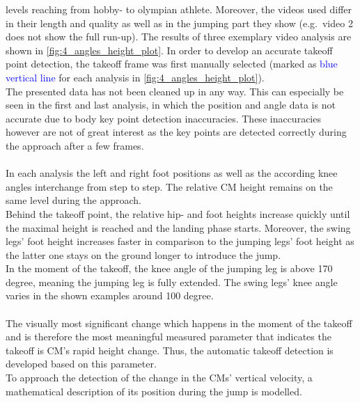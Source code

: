 levels reaching from hobby- to olympian athlete.
Moreover, the videos used differ in their length and quality as well as in the
jumping part they show (e.g.\ video 2 does not show the full run-up).
The results of three exemplary video analysis are shown in
\autoref{fig:4_angles_height_plot}.
In order to develop an accurate takeoff point detection, the takeoff frame was
first manually selected (marked as \textcolor{blue}{blue vertical line} for
each analysis in \autoref{fig:4_angles_height_plot}).\\
The presented data has not been cleaned up in any way.
This can especially be seen in the first and last analysis, in which the
position and angle data is not accurate due to body key point detection
inaccuracies.
These inaccuracies however are not of great interest as the key points are
detected correctly during the approach after a few frames.\\\\
In each analysis the left and right foot positions as well as the
according knee angles interchange from step to step.
The relative \ac{CM} height remains on the same level during the approach.\\
Behind the takeoff point, the relative hip- and foot heights increase quickly
until the maximal height is reached and the landing phase starts.
Moreover, the swing legs' foot height increases faster in comparison to the
jumping legs' foot height as the latter one stays on the ground longer to
introduce the jump.\\
In the moment of the takeoff, the knee angle of the jumping leg is above 170
degree, meaning the jumping leg is fully extended.
The swing legs' knee angle varies in the shown examples around 100 degree.\\\\
The visually most significant change which happens in the moment of the
takeoff and is therefore the most meaningful measured parameter that indicates
the takeoff is \ac{CM}'s rapid height change.
Thus, the automatic takeoff detection is developed based on this parameter.\\
To approach the detection of the change in the \ac{CM}s' vertical
velocity, a mathematical description of its position during the jump is
modelled.

